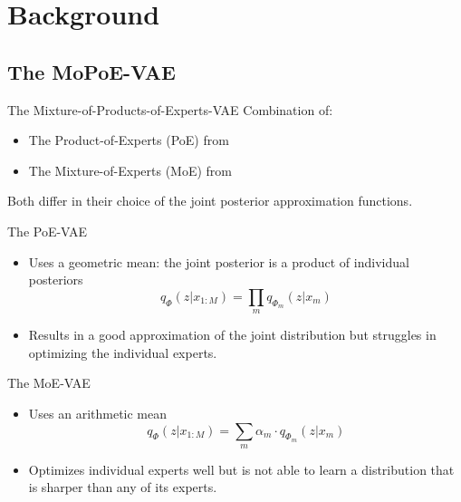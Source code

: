     \section{Background}
        \subsection{The MoPoE-VAE}
            \begin{frame}{The Mixture-of-Products-of-Experts-VAE}
            Combination of:
                \begin{itemize}
                    \item The Product-of-Experts (PoE) from \cite{wu2018multimodal}
                    \item The Mixture-of-Experts (MoE) from \cite{shi2019variational}
                \end{itemize}
                \vspace{\baselineskip}
                Both differ in their choice of the joint posterior approximation functions.
            \end{frame}
        
            \begin{frame}{The PoE-VAE}
            
                \begin{itemize}
                    \item Uses a geometric mean: the joint posterior is a product of individual posteriors
                \begin{equation}
                    q_{\Phi}(z|x_{1:M})=\prod _m q_{\Phi_m}(z|x_m)
                \end{equation}
                    \item Results in a good approximation of the joint distribution but struggles in optimizing the individual experts.
                \end{itemize}

            \end{frame}
            
            \begin{frame}{The MoE-VAE}
            \begin{itemize}
                \item Uses an arithmetic mean
                \begin{equation}
                    q_{\Phi}(z|x_{1:M})=\sum _m \alpha_m\cdot q_{\Phi_m}(z|x_m)
                \end{equation}
                \item Optimizes individual experts well but is not able to learn a distribution that is sharper than any of its experts.
            \end{itemize}
                
            \end{frame}
        
